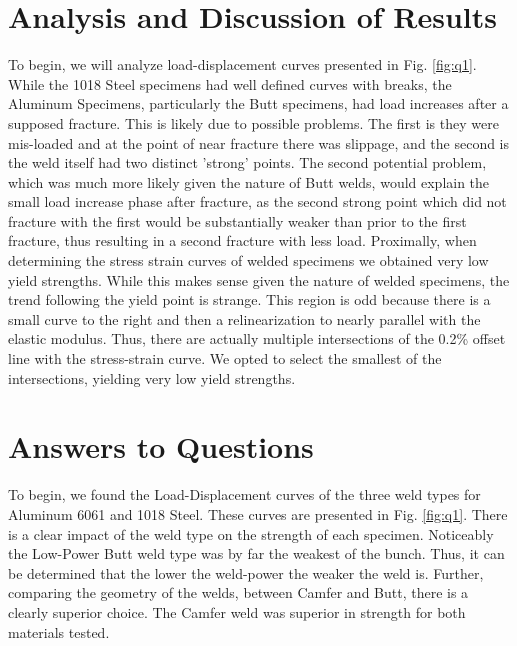 \documentclass{article}
\begin{document}
\section{Analysis and Discussion of Results}
To begin, we will analyze load-displacement curves presented in Fig. \ref{fig:q1}. While the 1018 Steel specimens had well defined curves with breaks, the Aluminum Specimens, particularly the Butt specimens, had load increases after a supposed fracture. This is likely due to possible problems. The first is they were mis-loaded and at the point of near fracture there was slippage, and the second is the weld itself had two distinct 'strong' points. The second potential problem, which was much more likely given the nature of Butt welds, would explain the small load increase phase after fracture, as the second strong point which did not fracture with the first would be substantially weaker than prior to the first fracture, thus resulting in a second fracture with less load. Proximally, when determining the stress strain curves of welded specimens we obtained very low yield strengths. While this makes sense given the nature of welded specimens, the trend following the yield point is strange. This region is odd because there is a small curve to the right and then a relinearization to nearly parallel with the elastic modulus. Thus, there are actually multiple intersections of the 0.2\% offset line with the stress-strain curve. We opted to select the smallest of the intersections, yielding very low yield strengths.
\newpage
\section{Answers to Questions}
To begin, we found the Load-Displacement curves of the three weld types for Aluminum 6061 and 1018 Steel. These curves are presented in Fig. \ref{fig:q1}. There is a clear impact of the weld type on the strength of each specimen. Noticeably the Low-Power Butt weld type was by far the weakest of the bunch. Thus, it can be determined that the lower the weld-power the weaker the weld is. Further, comparing the geometry of the welds, between Camfer and Butt, there is a clearly superior choice. The Camfer weld was superior in strength for both materials tested. 
\end{document}

